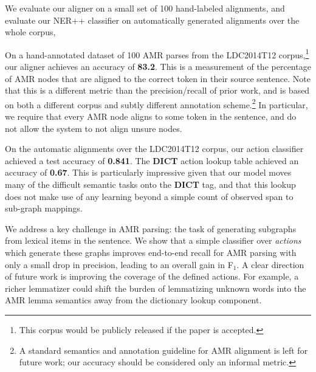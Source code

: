 \documentclass[11pt]{article}
\begin{document}
We evaluate our aligner on a small set of 100 hand-labeled alignments,
  and evaluate our NER++ classifier on automatically generated alignments over the whole corpus,
  
On a hand-annotated dataset of 100 AMR parses from the LDC2014T12 corpus,\footnote{
    This corpus would be publicly released if the paper is accepted.
  }
  our aligner achieves
  an accuracy of \textbf{83.2}.
This is a measurement of the percentage of AMR nodes that are
  aligned to the correct token in their source sentence.
Note that this is a different metric than the precision/recall of prior work, and
  is based on both a different corpus and subtly different annotation scheme.\footnote{ 
  A standard semantics and annotation guideline for AMR alignment is left for 
  future work; our accuracy should be considered only an informal metric.
}
In particular, we require that every AMR node aligns to some token in the sentence,
  and do not allow the system to not align unsure nodes.



On the automatic alignments over the LDC2014T12 corpus,
  our action classifier achieved a test accuracy of \textbf{0.841}.
The \textbf{DICT} action lookup table achieved an accuracy of \textbf{0.67}.
This is particularly impressive given that our model moves many of the difficult 
  semantic tasks onto the \textbf{DICT} tag, and that this lookup does not make
  use of any learning beyond a simple count of observed span to sub-graph mappings.


We address a key challenge in AMR parsing: 
  the task of generating subgraphs from lexical items in the sentence.
We show that a 
  simple classifier over \textit{actions} which generate
  these graphs improves end-to-end recall for AMR parsing with only a small
  drop in precision, leading to an overall gain in F$_1$.
A clear direction of future work is improving the coverage of the defined actions.
For example, a richer lemmatizer could shift the burden of lemmatizing unknown
  words into the AMR lemma semantics away from the dictionary lookup component.
  
\end{document}
